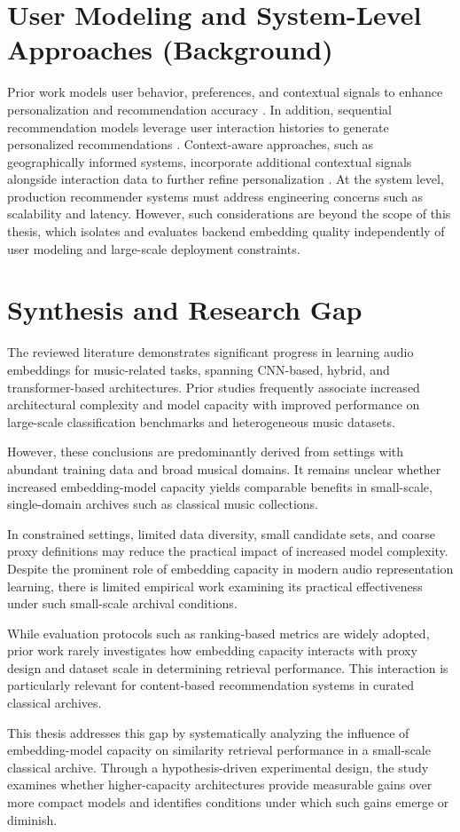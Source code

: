 \section{User Modeling and System-Level Approaches (Background)}
Prior work models user behavior, preferences, and contextual signals to enhance personalization and recommendation accuracy \cite{lin2025}. 
In addition, sequential recommendation models leverage user interaction histories to generate personalized recommendations \cite{abbattista2024}. 
Context-aware approaches, such as geographically informed systems, incorporate additional contextual signals alongside interaction data to further refine personalization \cite{schedl2021}.
At the system level, production recommender systems must address engineering concerns such as scalability and latency. 
However, such considerations are beyond the scope of this thesis, which isolates and evaluates backend embedding quality independently of user modeling and large-scale deployment constraints.


\section{Synthesis and Research Gap}
The reviewed literature demonstrates significant progress in learning audio embeddings for music-related tasks, spanning CNN-based, hybrid, and transformer-based architectures.
Prior studies frequently associate increased architectural complexity and model capacity with improved performance on large-scale classification benchmarks and heterogeneous music datasets.


However, these conclusions are predominantly derived from settings with abundant training data and broad musical domains.
It remains unclear whether increased embedding-model capacity yields comparable benefits in small-scale, single-domain archives such as classical music collections.

In constrained settings, limited data diversity, small candidate sets, and coarse proxy definitions may reduce the practical impact of increased model complexity.
Despite the prominent role of embedding capacity in modern audio representation learning, there is limited empirical work examining its practical effectiveness under such small-scale archival conditions.

While evaluation protocols such as ranking-based metrics are widely adopted, prior work rarely investigates how embedding capacity interacts with proxy design and dataset scale in determining retrieval performance.
This interaction is particularly relevant for content-based recommendation systems in curated classical archives.

This thesis addresses this gap by systematically analyzing the influence of embedding-model capacity on similarity retrieval performance in a small-scale classical archive.
Through a hypothesis-driven experimental design, the study examines whether higher-capacity architectures provide measurable gains over more compact models and identifies conditions under which such gains emerge or diminish.

